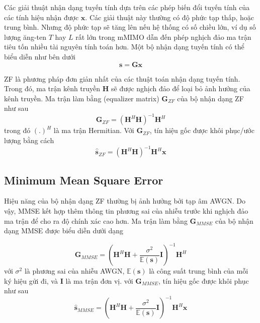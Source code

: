 


Các giải thuật nhận dạng tuyến tính dựa trên các phép biến đổi tuyến tính của các tính hiệu nhận được $\mathbf{x}$. Các giải thuật này thường có độ phức tạp thấp, hoặc trung bình. Nhưng độ phức tạp sẽ tăng lên nếu hệ thống có số chiều lớn, ví dụ số lượng ăng-ten $T$ hay $L$ rất lớn trong mMIMO dẫn đến phép nghịch đảo ma trận tiêu tốn nhiều tài nguyên tính toán hơn. Một bộ nhận dạng tuyến tính có thể biểu diễn như bên dưới
\begin{equation}
    \mathbf{s} = \mathbf{G} \mathbf{x}
\end{equation}

ZF là phương pháp đơn giản nhất của các thuật toán nhận dạng tuyến tính. Trong đó, ma trận kênh truyền $\mathbf{H}$ sẽ được nghịch đảo để loại bỏ ảnh hưởng của kênh truyền. Ma trận làm bằng (equalizer matrix) $\mathbf{G}_{ZF}$ của bộ nhận dạng ZF như sau
\begin{equation}
    \mathbf{G}_{ZF}=\left(\mathbf{H}^H \mathbf{H}\right)^{-1} \mathbf{H}^H
\end{equation}
trong đó $(.)^H$ là ma trận Hermitian. Với $\mathbf{G}_{ZF}$, tín hiệu gốc được khôi phục/ước lượng bằng cách
\begin{equation}
    \hat{\mathbf{s}}_{ZF}=\left(\mathbf{H}^H \mathbf{H}\right)^{-1} \mathbf{H}^H \mathbf{x}
\end{equation}

\subsection{Minimum Mean Square Error} \label{sec:mmse}

Hiệu năng của bộ nhận dạng ZF thường bị ảnh hưởng bởi tạp âm AWGN. Do vậy, MMSE kết hợp thêm thông tin phương sai của nhiễu trước khi nghịch đảo ma trận để cho ra độ chính xác cao hơn. Ma trận làm bằng $\mathbf{G}_{MMSE}$ của bộ nhận dạng MMSE được biểu diễn dưới dạng

\begin{equation}
    \mathbf{G}_{MMSE}=\left(\mathbf{H}^H \mathbf{H}+\frac{\sigma^2}{\mathbb{E}(\mathbf{s})} \mathbf{I}\right)^{-1} \mathbf{H}^H
\end{equation}
với $\sigma^2$ là phương sai của nhiễu AWGN, $\mathbb{E}(\mathbf{s})$ là công suất trung bình của mỗi ký hiệu gửi đi, và $\mathbf{I}$ là ma trận đơn vị. với $\mathbf{G}_{MMSE}$, tín hiệu gốc được khôi phục như sau
\begin{equation}
    \hat{\mathbf{s}}_{MMSE}=\left(\mathbf{H}^H \mathbf{H}+\frac{\sigma^2}{\mathbb{E}(\mathbf{s})} \mathbf{I}\right)^{-1} \mathbf{H}^H \mathbf{x}
\end{equation}

